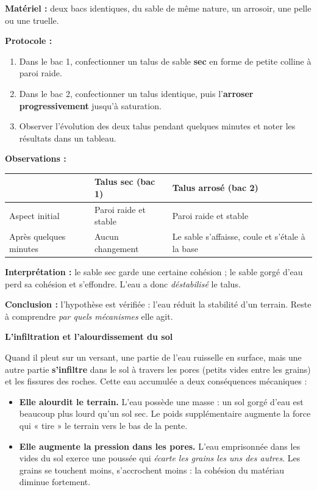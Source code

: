 \documentclass[11pt]{article}
\newcommand{\cle}[1]{{\popxbold\color{popdark}#1}}
\newcounter{popsec}
\newcounter{popsub}
\newcommand{\courssub}[1]{%
  \stepcounter{popsub}%
  \par\vspace{9pt}\noindent{\popxbold\fontsize{11.5}{13}\selectfont\color{popink}{\color{poporange}\thepopsec.\thepopsub}\hspace{6pt}#1}\par\nopagebreak\vspace{4pt}
}
\begin{document}
\begin{experience}
\textbf{Matériel :} deux bacs identiques, du sable de même nature, un arrosoir, une pelle ou une truelle.

\textbf{Protocole :}
\begin{enumerate}
\item Dans le bac 1, confectionner un talus de sable \textbf{sec} en forme de petite colline à paroi raide.
\item Dans le bac 2, confectionner un talus identique, puis l'\textbf{arroser progressivement} jusqu'à saturation.
\item Observer l'évolution des deux talus pendant quelques minutes et noter les résultats dans un tableau.
\end{enumerate}

\textbf{Observations :}
\begin{center}
\begin{tabularx}{\linewidth}{|l|X|X|}
\hline
\rowcolor{popblueL} & \textbf{Talus sec (bac 1)} & \textbf{Talus arrosé (bac 2)} \\
\hline
Aspect initial & Paroi raide et stable & Paroi raide et stable \\
\hline
Après quelques minutes & Aucun changement & Le sable s'affaisse, coule et s'étale à la base \\
\hline
\end{tabularx}
\end{center}

\textbf{Interprétation :} le sable sec garde une certaine cohésion ; le sable gorgé d'eau perd sa cohésion et s'effondre. L'eau a donc \emph{déstabilisé} le talus.

\textbf{Conclusion :} l'hypothèse est vérifiée : l'eau réduit la stabilité d'un terrain. Reste à comprendre \emph{par quels mécanismes} elle agit.
\end{experience}

\courssub{L'action mécanique de l'eau}

\textbf{L'infiltration et l'alourdissement du sol}

Quand il pleut sur un versant, une partie de l'eau ruisselle en surface, mais une autre partie \textbf{s'infiltre} dans le sol à travers les pores (petits vides entre les grains) et les fissures des roches. Cette eau accumulée a deux conséquences mécaniques :

\begin{itemize}
\item \textbf{Elle alourdit le terrain.} L'eau possède une masse : un sol gorgé d'eau est beaucoup plus lourd qu'un sol sec. Le poids supplémentaire augmente la force qui « tire » le terrain vers le bas de la pente.
\item \textbf{Elle augmente la pression dans les pores.} L'eau emprisonnée dans les vides du sol exerce une poussée qui \emph{écarte les grains les uns des autres}. Les grains se touchent moins, s'accrochent moins : la \cle{cohésion} du matériau diminue fortement.
\end{itemize}
\end{document}
